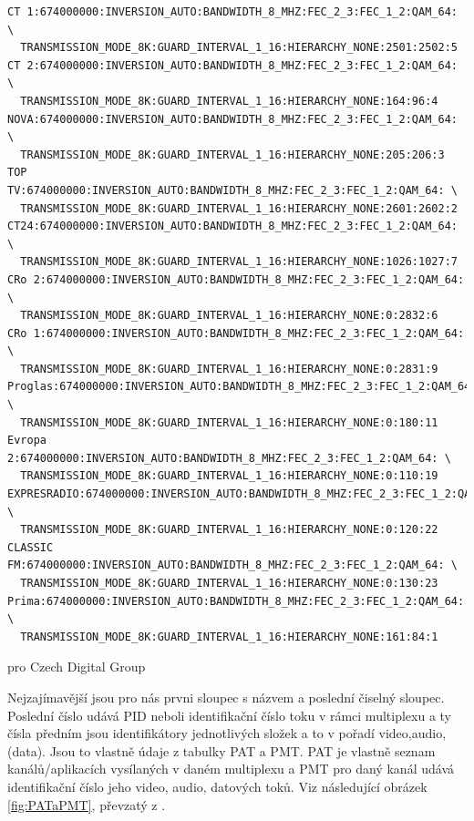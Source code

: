 \begin{small}
\begin{verbatim}
CT 1:674000000:INVERSION_AUTO:BANDWIDTH_8_MHZ:FEC_2_3:FEC_1_2:QAM_64: \
  TRANSMISSION_MODE_8K:GUARD_INTERVAL_1_16:HIERARCHY_NONE:2501:2502:5
CT 2:674000000:INVERSION_AUTO:BANDWIDTH_8_MHZ:FEC_2_3:FEC_1_2:QAM_64: \
  TRANSMISSION_MODE_8K:GUARD_INTERVAL_1_16:HIERARCHY_NONE:164:96:4
NOVA:674000000:INVERSION_AUTO:BANDWIDTH_8_MHZ:FEC_2_3:FEC_1_2:QAM_64: \
  TRANSMISSION_MODE_8K:GUARD_INTERVAL_1_16:HIERARCHY_NONE:205:206:3
TOP TV:674000000:INVERSION_AUTO:BANDWIDTH_8_MHZ:FEC_2_3:FEC_1_2:QAM_64: \
  TRANSMISSION_MODE_8K:GUARD_INTERVAL_1_16:HIERARCHY_NONE:2601:2602:2
CT24:674000000:INVERSION_AUTO:BANDWIDTH_8_MHZ:FEC_2_3:FEC_1_2:QAM_64: \
  TRANSMISSION_MODE_8K:GUARD_INTERVAL_1_16:HIERARCHY_NONE:1026:1027:7
CRo 2:674000000:INVERSION_AUTO:BANDWIDTH_8_MHZ:FEC_2_3:FEC_1_2:QAM_64: \
  TRANSMISSION_MODE_8K:GUARD_INTERVAL_1_16:HIERARCHY_NONE:0:2832:6
CRo 1:674000000:INVERSION_AUTO:BANDWIDTH_8_MHZ:FEC_2_3:FEC_1_2:QAM_64: \
  TRANSMISSION_MODE_8K:GUARD_INTERVAL_1_16:HIERARCHY_NONE:0:2831:9
Proglas:674000000:INVERSION_AUTO:BANDWIDTH_8_MHZ:FEC_2_3:FEC_1_2:QAM_64: \
  TRANSMISSION_MODE_8K:GUARD_INTERVAL_1_16:HIERARCHY_NONE:0:180:11
Evropa 2:674000000:INVERSION_AUTO:BANDWIDTH_8_MHZ:FEC_2_3:FEC_1_2:QAM_64: \
  TRANSMISSION_MODE_8K:GUARD_INTERVAL_1_16:HIERARCHY_NONE:0:110:19
EXPRESRADIO:674000000:INVERSION_AUTO:BANDWIDTH_8_MHZ:FEC_2_3:FEC_1_2:QAM_64: \
  TRANSMISSION_MODE_8K:GUARD_INTERVAL_1_16:HIERARCHY_NONE:0:120:22
CLASSIC FM:674000000:INVERSION_AUTO:BANDWIDTH_8_MHZ:FEC_2_3:FEC_1_2:QAM_64: \
  TRANSMISSION_MODE_8K:GUARD_INTERVAL_1_16:HIERARCHY_NONE:0:130:23
Prima:674000000:INVERSION_AUTO:BANDWIDTH_8_MHZ:FEC_2_3:FEC_1_2:QAM_64: \
  TRANSMISSION_MODE_8K:GUARD_INTERVAL_1_16:HIERARCHY_NONE:161:84:1
\end{verbatim}
\end{small}

\vspace{10pt}

pro Czech Digital Group 

\vspace{10pt}

Nejzajímavější jsou pro nás prvni sloupec s názvem a poslední čiselný sloupec. Poslední číslo udává PID neboli identifikační číslo toku v rámci multiplexu a ty čísla předním jsou identifikátory jednotlivých složek a to v pořadí video,audio,(data).
Jsou to vlastně údaje z tabulky PAT a PMT. PAT je vlastně seznam kanálů/aplikacích vysílaných v daném multiplexu a PMT pro daný kanál udává identifikační číslo jeho video, audio, datových toků. Viz následující obrázek \ref{fig:PATaPMT}, převzatý z \cite{digitvURL}.


